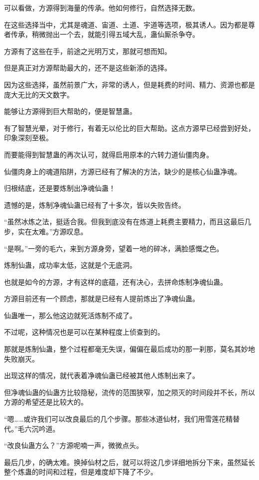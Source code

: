\begin{this_body}
可以看做，方源得到海量的传承。他如何修行，自然选择无数。

在这些选择当中，尤其是魂道、宙道、土道、宇道等选项，极其诱人。因为都是尊者传承，稍微抛出一个去，就能引得五域大乱，蛊仙厮杀争夺。

方源有了这些在手，前途之光明万丈，那就可想而知。

但是真正对方源帮助最大的，还不是这些新添的选择。

因为这些选择，虽然前景广大，非常的诱人，但是耗费的时间、精力、资源也都是庞大无比的天文数字。

能够让方源得到巨大帮助的，便是智慧蛊。

有了智慧光晕，对于修行，有着无以伦比的巨大帮助。这点方源早已经尝到好处，印象深刻至极。

而要能得到智慧蛊的再次认可，就得启用原本的六转力道仙僵肉身。

仙僵肉身上的魂道陷阱，方源已经有了解决的方法，缺少的是核心仙蛊净魂。

归根结底，还是要炼制出净魂仙蛊！

遗憾的是，炼制净魂仙蛊已经有了十多次，皆以失败告终。

“虽然冰炼之法，挺适合我。但我到底没有在炼道上耗费主要精力，而且这最后几步，实在太难。”方源叹息。

“是啊。”一旁的毛六，来到方源身旁，望着一地的碎冰，满脸感慨之色。

炼制仙蛊，成功率太低，这就是个无底洞。

也就是如今的方源，才有这样的底蕴，还有决心，去拼命炼制净魂仙蛊。

方源目前还有一个顾虑，那就是已经有人提前炼出了净魂仙蛊。

仙蛊唯一，那么他这边就死活炼制不成了。

不过呢，这种情况也是可以在某种程度上侦查到的。

那就是炼制仙蛊，整个过程都毫无失误，偏偏在最后成功的那一刹那，莫名其妙地失败崩灭。

出现这样的情况，就代表着净魂仙蛊已经被其他人炼制出来了。

但净魂仙蛊的仙蛊方比较隐秘，流传的范围狭窄，加之陨灭的时间段并不长，所以方源的希望还是比较大的。

“嗯……或许我们可以改良最后的几个步骤。那些冰道仙材，我们用雪莲花精替代。”毛六沉吟道。

“改良仙蛊方么？”方源呢喃一声，微微点头。

最后几步，的确太难。换掉仙材之后，就可以将这几步详细地拆分下来，虽然延长整个炼蛊的时间和过程，但是难度却下降了不少。


\end{this_body}
